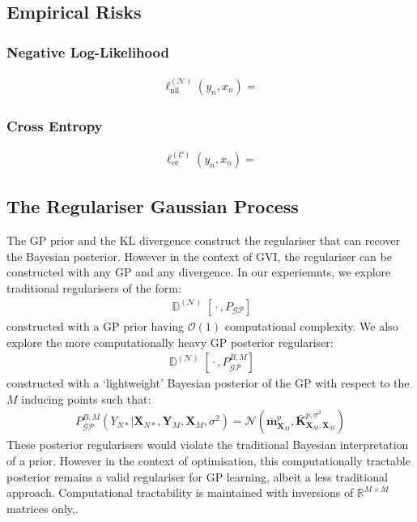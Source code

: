 \documentclass{article}
\newcommand{\D}{\operatorname{\mathbb{D}}}
\newcommand{\GP}{\operatorname{\mathcal{GP}}}
\newcommand{\wc}{\operatorname{{}\cdot{}}}
\numberwithin{equation}{section}
\begin{document}
\subsection{Empirical Risks}
\subsubsection{Negative Log-Likelihood}
\begin{align}
    \ell_{\text{nll}}^{(\mathcal{N})}(y_n, x_n) =
\end{align}
\subsubsection{Cross Entropy}
\begin{align}
    \ell_{\text{ce}}^{(\mathcal{C})}(y_n, x_n) =
\end{align}
\subsection{The Regulariser Gaussian Process}
The GP prior and the KL divergence construct the regulariser that can recover the Bayesian posterior. However in the context of GVI, the regulariser can be constructed with any GP and any divergence. In our experiemnts, we explore traditional regularisers of the form:
\begin{align}
    \D^{(\mathcal{N})}\left[\wc, P_{\GP}\right]
    \label{prior-regulariser}
\end{align}
constructed with a GP prior having $\mathcal{O}(1)$ computational complexity. We also explore the more computationally heavy GP posterior regulariser:
\begin{align}
    \D^{(\mathcal{N})}\left[\wc, P^{B, M}_{\GP}\right]
    \label{posterior-regulariser}
\end{align}
constructed with a `lightweight' Bayesian posterior of the GP with respect to the $M$ inducing points such that:
\begin{align}
    P^{B, M}_{\GP}\left(Y_{N*} \vert \mathbf{X}_{N*}, \mathbf{Y}_M, \mathbf{X}_M, \sigma^2\right) = \mathcal{N}\left(\bar{\mathbf{m}}_{\mathbf{X}_M}^p, \bar{\mathbf{K}}_{\mathbf{X}_M, \mathbf{X}_M}^{p, \sigma^2}\right)
\end{align}
These posterior regularisers would violate the traditional Bayesian interpretation of a prior. However in the context of optimisation, this computationally tractable posterior remains a valid regulariser for GP learning, albeit a less traditional approach. Computational tractability is maintained with inversions of $\mathbb{R}^{M\times M}$ matrices only,.
\end{document}
